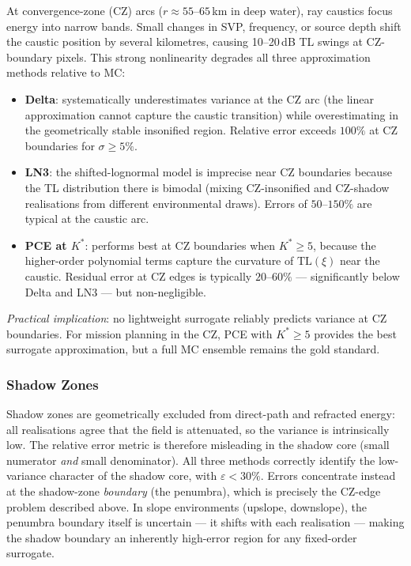 \documentclass[11pt,a4paper]{article}
\begin{document}
At convergence-zone (CZ) arcs ($r \approx 55$--$65$\,km in deep water), ray caustics focus
energy into narrow bands.
Small changes in SVP, frequency, or source depth shift the caustic position by several
kilometres, causing 10--20\,dB TL swings at CZ-boundary pixels.
This strong nonlinearity degrades all three approximation methods relative to MC:
\begin{itemize}
  \item \textbf{Delta}: systematically underestimates variance at the CZ arc (the linear
        approximation cannot capture the caustic transition) while overestimating in the
        geometrically stable insonified region.
        Relative error exceeds $100\%$ at CZ boundaries for $\sigma \geq 5\%$.
  \item \textbf{LN3}: the shifted-lognormal model is imprecise near CZ boundaries because the
        TL distribution there is bimodal (mixing CZ-insonified and CZ-shadow realisations
        from different environmental draws).
        Errors of $50$--$150\%$ are typical at the caustic arc.
  \item \textbf{PCE at $K^*$}: performs best at CZ boundaries when $K^* \geq 5$, because the
        higher-order polynomial terms capture the curvature of $\mathrm{TL}(\xi)$ near the
        caustic.
        Residual error at CZ edges is typically $20$--$60\%$ --- significantly below Delta and
        LN3 --- but non-negligible.
\end{itemize}
\emph{Practical implication}: no lightweight surrogate reliably predicts variance at CZ
boundaries.
For mission planning in the CZ, PCE with $K^* \geq 5$ provides the best surrogate approximation,
but a full MC ensemble remains the gold standard.

\subsubsection{Shadow Zones}

Shadow zones are geometrically excluded from direct-path and refracted energy: all realisations
agree that the field is attenuated, so the variance is intrinsically low.
The relative error metric is therefore misleading in the shadow core
(small numerator \emph{and} small denominator).
All three methods correctly identify the low-variance character of the shadow core,
with $\varepsilon < 30\%$.
Errors concentrate instead at the shadow-zone \emph{boundary} (the penumbra), which
is precisely the CZ-edge problem described above.
In slope environments (upslope, downslope), the penumbra boundary itself is uncertain ---
it shifts with each realisation --- making the shadow boundary an inherently high-error region
for any fixed-order surrogate.
\end{document}
